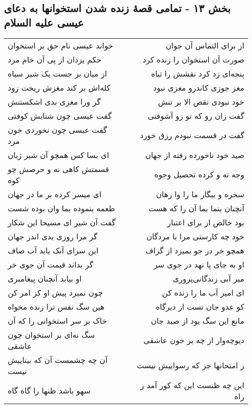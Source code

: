 \begin{center}
\section*{بخش ۱۳ - تمامی قصهٔ زنده شدن استخوانها به دعای عیسی علیه السلام}
\label{sec:sh013}
\begin{longtable}{l p{0.5cm} r}
خواند عیسی نام حق بر استخوان
&&
از برای التماس آن جوان
\\
حکم یزدان از پی آن خام مرد
&&
صورت آن استخوان را زنده کرد
\\
از میان بر جست یک شیر سیاه
&&
پنجه‌ای زد کرد نقشش را تباه
\\
کله‌اش بر کند مغزش ریخت زود
&&
مغز جوزی کاندرو مغزی نبود
\\
گر ورا مغزی بدی اشکستنش
&&
خود نبودی نقص الا بر تنش
\\
گفت عیسی چون شتابش کوفتی
&&
گفت زان رو که تو زو آشوفتی
\\
گفت عیسی چون نخوردی خون مرد
&&
گفت در قسمت نبودم رزق خورد
\\
ای بسا کس همچو آن شیر ژیان
&&
صید خود ناخورده رفته از جهان
\\
قسمتش کاهی نه و حرصش چو کوه
&&
وجه نه و کرده تحصیل وجوه
\\
ای میسر کرده بر ما در جهان
&&
سخره و بیگار ما را وا رهان
\\
طعمه بنموده بما وان بوده شست
&&
آنچنان بنما بما آن را که هست
\\
گفت آن شیر ای مسیحا این شکار
&&
بود خالص از برای اعتبار
\\
گر مرا روزی بدی اندر جهان
&&
خود چه کارستی مرا با مردگان
\\
این سزای آنک یابد آب صاف
&&
همچو خر در جو بمیزد از گزاف
\\
گر بداند قیمت آن جوی خر
&&
او به جای پا نهد در جوی سر
\\
او بیابد آنچنان پیغامبری
&&
میر آبی زندگانی‌پروری
\\
چون نمیرد پیش او کز امر کن
&&
ای امیر آب ما را زنده کن
\\
هین سگ نفس ترا زنده مخواه
&&
کو عدو جان تست از دیرگاه
\\
خاک بر سر استخوانی را که آن
&&
مانع این سگ بود از صید جان
\\
سگ نه‌ای بر استخوان چون عاشقی
&&
دیوچه‌وار از چه بر خون عاشقی
\\
آن چه چشمست آن که بیناییش نیست
&&
ز امتحانها جز که رسواییش نیست
\\
سهو باشد ظنها را گاه گاه
&&
این چه ظنست این که کور آمد ز راه
\\

\end{longtable}
\end{center}
